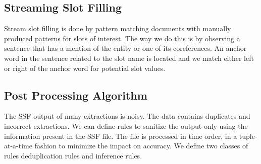 \subsection{Streaming Slot Filling}

Stream slot filling is done by pattern matching documents with manually 
produced patterns for slots of interest. The way we do this is by observing a 
sentence that has a mention of the entity or one of its coreferences. An 
anchor word in the sentence related to the slot name is located and we match 
either left or right of the anchor word for potential slot values. 

\subsection{Post Processing Algorithm}

The SSF output of many extractions is noisy. The data contains duplicates and 
incorrect extractions. We can define rules to sanitize the output only using 
the information present in the SSF file. The file is processed in time order, 
in a tuple-at-a-time fashion to minimize the impact on accuracy. We define 
two classes of rules deduplication rules and inference rules.
